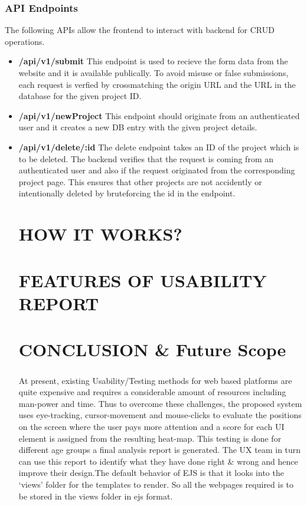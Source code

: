 \documentclass[12pt,a4paper,final]{extreport}
\begin{document}
\subsection{API Endpoints}
The following APIs allow the frontend to interact with backend for CRUD operations.
\begin{itemize}
    \item \textbf{/api/v1/submit} This endpoint is used to recieve the form data from the website and it is available publically. To avoid misuse or false submissions, each request is verfied by crossmatching the origin URL and the URL in the database for the given project ID.
    \item \textbf{/api/v1/newProject} This endpoint should originate from an authenticated user and it creates a new DB entry with the given project details.
    \item \textbf{/api/v1/delete/:id} The delete endpoint takes an ID of the project which is to be deleted. The backend verifies that the request is coming from an authenticated user and also if the request originated from the corresponding project page. This ensures that other projects are not accidently or intentionally deleted by bruteforcing the id in the endpoint.

\newpage
\chapter{HOW IT WORKS?}


\newpage
\chapter{FEATURES OF USABILITY REPORT}


\newpage
\chapter{CONCLUSION \& Future Scope}
\paragraph{}
At present, existing Usability/\-Testing methods for web based platforms are quite expensive and requires a considerable amount of resources including man-power and time.
Thus to overcome these challenges, the proposed system uses eye-tracking, cursor-movement and mouse-clicks to evaluate the positions on the screen where the user pays more attention and a score for each UI element is assigned from the resulting heat-map.
This testing is done for different age groups a final analysis report is generated. The UX team in turn can use this report to identify what they have done right \& wrong and hence improve their design.The default behavior of EJS is that it looks into the ‘views’ folder for the templates to render. So all the webpages required is to be stored in the views folder in ejs format.


\end{itemize}
\end{document}
